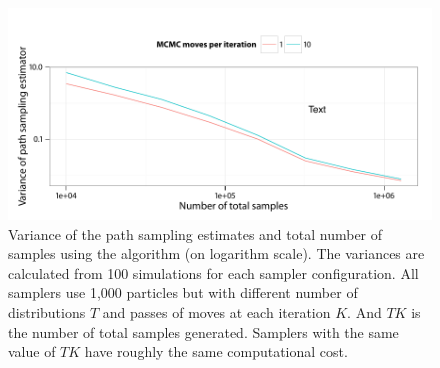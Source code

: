 \begin{figure}[t]
  \UseAltLinespread
  \includegraphics[width=\linewidth]{fig_src/MCMC_Iter_Var}
  \caption[Variance of path sampling estimator and total number of samples
  using \protect\smc algorithm]
  {Variance of the path sampling estimates and total number of samples using the \smc[2] algorithm (on logarithm scale). The variances are calculated from 100 simulations for each sampler configuration. All samplers use 1,000 particles but with different number of distributions $T$ and passes of \mcmc moves at each iteration $K$. And $TK$ is the number of total samples generated. Samplers with the same value of $TK$ have roughly the same computational cost.}
  \label{fig:fast mcmc iter}
\end{figure}
